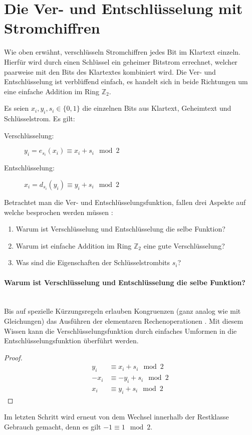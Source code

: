 \section{Die Ver- und Entschlüsselung mit Stromchiffren}
Wie oben erwähnt, verschlüsseln Stromchiffren jedes Bit im Klartext einzeln. Hierfür
wird durch einen Schlüssel ein geheimer Bitstrom errechnet, welcher paarweise mit den Bits
des Klartextes kombiniert wird. Die Ver- und Entschlüsselung ist verblüffend einfach, es handelt
sich in beide Richtungen um eine einfache Addition im Ring $\mathbb{Z}_2$.

\begin{definition}
  Es seien $x_i,y_i,s_i \in \{0,1\}$ die einzelnen Bits aus Klartext, Geheimtext und Schlüs\-selstrom.
  Es gilt:
  \begin{description}
    \item[Verschlüsselung:] $y_i = e_{s_i}(x_i) \equiv x_i + s_i \mod{2}$
    \item[Entschlüsselung:] $x_i = d_{s_i}(y_i) \equiv y_i + s_i \mod{2}$
  \end{description}
\end{definition}

\noindent
Betrachtet man die Ver- und Entschlüsselungsfunktion, fallen drei Aspekte auf welche
besprochen werden müssen \parencite[31-34]{BOOK:crypto}:

\begin{enumerate}
  \item Warum ist Verschlüsselung und Entschlüsselung die selbe Funktion?
  \item Warum ist einfache Addition im Ring $\mathbb{Z}_2$ eine gute Verschlüsselung?
  \item Was sind die Eigenschaften der Schlüsselstrombits $s_i$?
\end{enumerate}

\paragraph{Warum ist Verschlüsselung und Entschlüsselung die selbe Funktion?}\mbox{}\\
Bis auf spezielle Kürzungsregeln erlauben Kongruenzen (ganz analog wie mit Gleichungen)
das Ausführen der elementaren Rechenoperationen \parencite[181-183]{BOOK:numberTheory}.
Mit diesem Wissen kann die Verschlüsselungsfunktion durch einfaches Umformen in die
Entschlüsselungsfunktion überführt werden.
\begin{proof}
  \begin{align*}
    y_i  & \equiv x_i + s_i \mod{2}  \\
    -x_i & \equiv -y_i + s_i \mod{2} \\
    x_i  & \equiv y_i + s_i \mod{2}
  \end{align*}
\end{proof}
\noindent
Im letzten Schritt wird erneut von dem Wechsel innerhalb der Restklasse Gebrauch gemacht,
denn es gilt $-1 \equiv 1 \mod{2}$.

